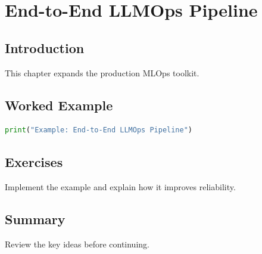 \chapter{End-to-End LLMOps Pipeline}
\label{chap:vol10-10}



\section{Introduction}
This chapter expands the production MLOps toolkit.

\section{Worked Example}
\begin{lstlisting}[language=Python]
print("Example: End-to-End LLMOps Pipeline")
\end{lstlisting}

\section{Exercises}
\begin{exercise}
Implement the example and explain how it improves reliability.
\end{exercise}

\section{Summary}
Review the key ideas before continuing.
